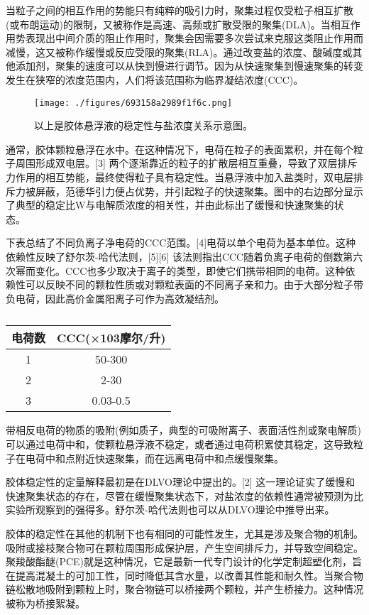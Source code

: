 当粒子之间的相互作用的势能只有纯粹的吸引力时，聚集过程仅受粒子相互扩散(或布朗运动)的限制，又被称作是高速、高频或扩散受限的聚集(DLA)。当相互作用势表现出中间介质的阻止作用时，聚集会因需要多次尝试来克服这类阻止作用而减慢，这又被称作缓慢或反应受限的聚集(RLA)。通过改变盐的浓度、酸碱度或其他添加剂，聚集的速度可以从快到慢进行调节。因为从快速聚集到慢速聚集的转变发生在狭窄的浓度范围内，人们将该范围称为临界凝结浓度(CCC)。
\begin{figure}[ht]
\centering
\texttt{[image: ./figures/693158a2989f1f6c.png]}
\caption{以上是胶体悬浮液的稳定性与盐浓度关系示意图。} \label{fig_LZJH_1}
\end{figure}
通常，胶体颗粒悬浮在水中。在这种情况下，电荷在粒子的表面累积，并在每个粒子周围形成双电层。[3] 两个逐渐靠近的粒子的扩散层相互重叠，导致了双层排斥力作用的相互势能，最终使得粒子具有稳定性。当悬浮液中加入盐类时，双电层排斥力被屏蔽，范德华引力便占优势，并引起粒子的快速聚集。图中的右边部分显示了典型的稳定比W与电解质浓度的相关性，并由此标出了缓慢和快速聚集的状态。

下表总结了不同负离子净电荷的CCC范围。[4]电荷以单个电荷为基本单位。这种依赖性反映了舒尔茨-哈代法则，[5][6] 该法则指出CCC随着负离子电荷的倒数第六次幂而变化。CCC也多少取决于离子的类型，即使它们携带相同的电荷。这种依赖性可以反映不同的颗粒性质或对颗粒表面的不同离子亲和力。由于大部分粒子带负电荷，因此高价金属阳离子可作为高效凝结剂。
\begin{table}[ht]
\centering
\caption\label{LZJH}
\begin{tabular}{|c|c}
\hline
\textbf{电荷数} & \textbf{CCC(×103摩尔/升)}\\
\hline
1 & 50-300\\
\hline
2 & 2-30\\
\hline
3 & 0.03-0.5\\
\hline
\end{tabular}
\end{table}
带相反电荷的物质的吸附(例如质子，典型的可吸附离子、表面活性剂或聚电解质)可以通过电荷中和，使颗粒悬浮液不稳定，或者通过电荷积累使其稳定，这导致粒子在电荷中和点附近快速聚集，而在远离电荷中和点缓慢聚集。

胶体稳定性的定量解释最初是在DLVO理论中提出的。[2] 这一理论证实了缓慢和快速聚集状态的存在，尽管在缓慢聚集状态下，对盐浓度的依赖性通常被预测为比实验所观察到的强得多。舒尔茨-哈代法则也可以从DLVO理论中推导出来。

胶体的稳定性在其他的机制下也有相同的可能性发生，尤其是涉及聚合物的机制。吸附或接枝聚合物可在颗粒周围形成保护层，产生空间排斥力，并导致空间稳定。聚羧酸酯醚(PCE)就是这种情况，它是最新一代专门设计的化学定制超塑化剂，旨在提高混凝土的可加工性，同时降低其含水量，以改善其性能和耐久性。当聚合物链松散地吸附到颗粒上时，聚合物链可以桥接两个颗粒，并产生桥接力。这种情况被称为桥接絮凝。

